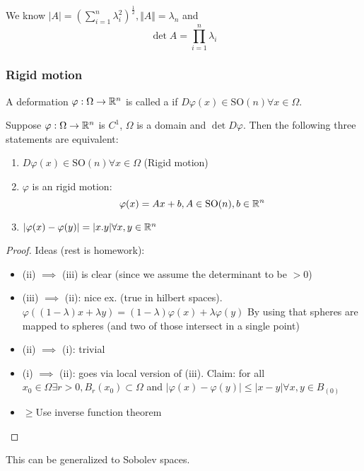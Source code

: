 We know \(|A|=(\sum_{i=1}^n \lambda_i^2)^\frac{1}{2},\Vert A \Vert = \lambda_n\) and 
\[\det A=\prod_{i=1}^n \lambda_i\]

\subsubsection*{Rigid motion}


\begin{definition}\label{def:1.6}
    A deformation \(\varphi:\Omega\to \mathbb{R}^n\) is called a  if \(D\varphi(x)\in \text{SO}(n)\forall x\in \Omega\).
\end{definition}

\begin{theorem}[Liouville]\label{thm:1.7}
    Suppose \(\varphi:\Omega\to\mathbb{R}^n\) is \(C^1\), \(\Omega\) is a domain and \(\det D\varphi\). Then the following three statements are equivalent:
    \begin{enumerate}
        \item \(D\varphi(x)\in\text{SO}(n)\forall x\in \Omega\) (Rigid motion)
        \item \(\varphi\) is an  rigid motion: \[\varphi(x)=Ax+b, A\in \text{SO}(n),b\in \mathbb{R}^n\]
        \item \(|\varphi(x)-\varphi(y)|=|x.y|\forall x,y\in \mathbb{R}^n\)
    \end{enumerate} 
\end{theorem}

\begin{proof}
    Ideas (rest is homework):

    \begin{itemize}
        \item (ii) \(\implies\) (iii) is clear (since we assume the determinant to be $>0$)
        \item (iii) \(\implies\) (ii): nice ex. (true in hilbert spaces). \(\varphi((1-\lambda)x+\lambda y)=(1-\lambda)\varphi(x)+\lambda\varphi(y)\) By using that spheres are mapped to spheres (and two of those intersect in a single point)
        \item (ii) \(\implies\) (i): trivial
        \item (i) \(\implies\) (ii): goes via local version of (iii). Claim: for all \(x_0\in\Omega\exists r>0, B_r(x_0)\subset \Omega\) and \(|\varphi(x)-\varphi(y)|\leq |x-y|\forall x,y\in B_(0)\)
        \item \(\geq \)Use inverse function theorem 
    \end{itemize}
\end{proof}

This can be generalized to Sobolev spaces.

